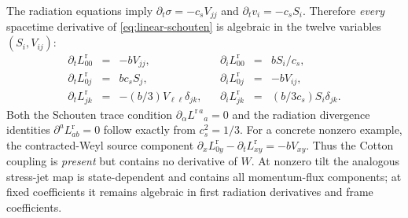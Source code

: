 \documentclass[11pt,a4paper]{article}
\begin{document}
The radiation equations imply
$\partial_t\sigma=-c_sV_{jj}$
and $\partial_tv_i=-c_sS_i$.
Therefore \emph{every} spacetime
derivative of \eqref{eq:linear-schouten}
is algebraic in the twelve
variables $(S_i,V_{ij})$:
\begin{equation}\label{eq:schouten-jet}
\begin{array}{rclcrcl}
\partial_t L^{\mathrm r}_{00}&=&-bV_{jj},
&&\partial_iL^{\mathrm r}_{00}&=&bS_i/c_s,\\
\partial_t L^{\mathrm r}_{0j}&=&bc_sS_j,
&&\partial_iL^{\mathrm r}_{0j}&=&-bV_{ij},\\
\partial_t L^{\mathrm r}_{jk}&=&-(b/3)V_{\ell\ell}\delta_{jk},
&&\partial_iL^{\mathrm r}_{jk}&=&
(b/3c_s)S_i\delta_{jk}.
\end{array}
\end{equation}
Both the Schouten trace condition
$\partial_\alpha L^{\mathrm r\,a}{}_a=0$
and the radiation divergence identities
$\partial^aL^{\mathrm r}_{ab}=0$
follow exactly from
$c_s^2=1/3$.
For a concrete nonzero example,
the contracted-Weyl source component
$\partial_x L^{\mathrm r}_{0y}
-\partial_t L^{\mathrm r}_{xy}
=-bV_{xy}$.
Thus the Cotton coupling is
\emph{present} but contains no
derivative of $W$.
At nonzero tilt the analogous
stress-jet map is state-dependent
and contains all momentum-flux
components; at fixed coefficients
it remains algebraic in first
radiation derivatives and frame
coefficients.
\end{document}
